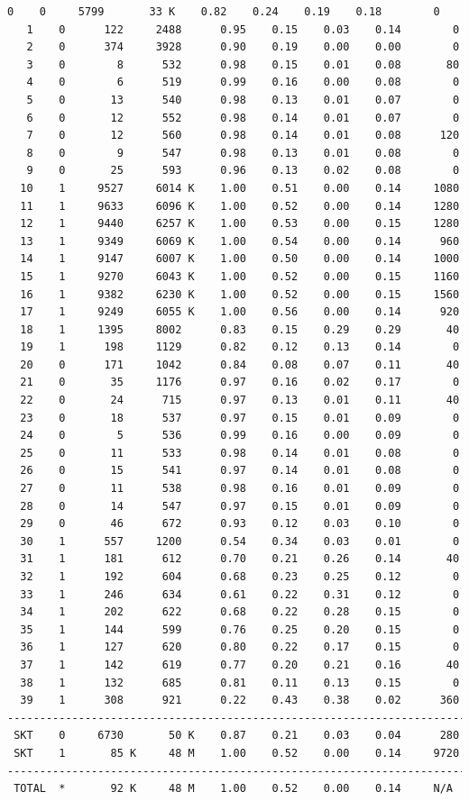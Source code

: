 \begin{lstlisting}[language=TeX]
   0    0     5799       33 K    0.82    0.24    0.19    0.18        0
   1    0      122     2488      0.95    0.15    0.03    0.14        0
   2    0      374     3928      0.90    0.19    0.00    0.00        0
   3    0        8      532      0.98    0.15    0.01    0.08       80
   4    0        6      519      0.99    0.16    0.00    0.08        0
   5    0       13      540      0.98    0.13    0.01    0.07        0
   6    0       12      552      0.98    0.14    0.01    0.07        0
   7    0       12      560      0.98    0.14    0.01    0.08      120
   8    0        9      547      0.98    0.13    0.01    0.08        0
   9    0       25      593      0.96    0.13    0.02    0.08        0
  10    1     9527     6014 K    1.00    0.51    0.00    0.14     1080
  11    1     9633     6096 K    1.00    0.52    0.00    0.14     1280
  12    1     9440     6257 K    1.00    0.53    0.00    0.15     1280
  13    1     9349     6069 K    1.00    0.54    0.00    0.14      960
  14    1     9147     6007 K    1.00    0.50    0.00    0.14     1000
  15    1     9270     6043 K    1.00    0.52    0.00    0.15     1160
  16    1     9382     6230 K    1.00    0.52    0.00    0.15     1560
  17    1     9249     6055 K    1.00    0.56    0.00    0.14      920
  18    1     1395     8002      0.83    0.15    0.29    0.29       40
  19    1      198     1129      0.82    0.12    0.13    0.14        0
  20    0      171     1042      0.84    0.08    0.07    0.11       40
  21    0       35     1176      0.97    0.16    0.02    0.17        0
  22    0       24      715      0.97    0.13    0.01    0.11       40
  23    0       18      537      0.97    0.15    0.01    0.09        0
  24    0        5      536      0.99    0.16    0.00    0.09        0
  25    0       11      533      0.98    0.14    0.01    0.08        0
  26    0       15      541      0.97    0.14    0.01    0.08        0
  27    0       11      538      0.98    0.16    0.01    0.09        0
  28    0       14      547      0.97    0.15    0.01    0.09        0
  29    0       46      672      0.93    0.12    0.03    0.10        0
  30    1      557     1200      0.54    0.34    0.03    0.01        0
  31    1      181      612      0.70    0.21    0.26    0.14       40
  32    1      192      604      0.68    0.23    0.25    0.12        0
  33    1      246      634      0.61    0.22    0.31    0.12        0
  34    1      202      622      0.68    0.22    0.28    0.15        0
  35    1      144      599      0.76    0.25    0.20    0.15        0
  36    1      127      620      0.80    0.22    0.17    0.15        0
  37    1      142      619      0.77    0.20    0.21    0.16       40
  38    1      132      685      0.81    0.11    0.13    0.15        0
  39    1      308      921      0.22    0.43    0.38    0.02      360
------------------------------------------------------------------------
 SKT    0     6730       50 K    0.87    0.21    0.03    0.04      280
 SKT    1       85 K     48 M    1.00    0.52    0.00    0.14     9720
------------------------------------------------------------------------
 TOTAL  *       92 K     48 M    1.00    0.52    0.00    0.14     N/A
\end{lstlisting}
